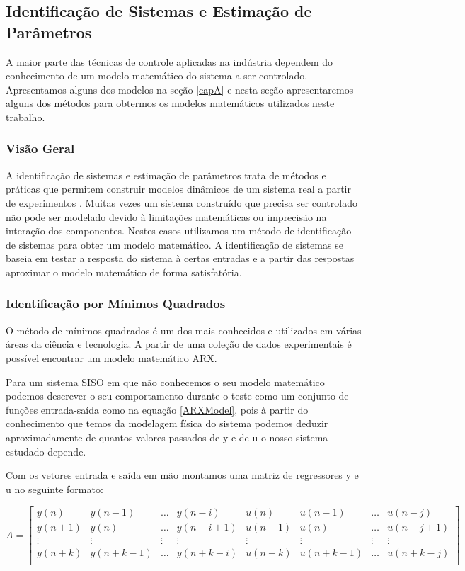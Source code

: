 \subsection{Identificação de Sistemas e Estimação de Parâmetros}
A maior parte das técnicas de controle aplicadas na indústria dependem do conhecimento de um modelo matemático do sistema a ser controlado. Apresentamos alguns dos modelos na seção \ref{capA} e nesta seção apresentaremos alguns dos métodos para obtermos os modelos matemáticos utilizados neste trabalho.


\subsubsection{Visão Geral}
A identificação de sistemas e estimação de parâmetros trata de métodos e práticas que permitem construir modelos dinâmicos de um sistema real a partir de experimentos . Muitas vezes um sistema construído que precisa ser controlado não pode ser modelado devido à limitações matemáticas ou imprecisão na interação dos componentes. Nestes casos utilizamos um método de identificação de sistemas para obter um modelo matemático. A identificação de sistemas se baseia em testar a resposta do sistema à certas entradas e a partir das respostas aproximar o modelo matemático de forma satisfatória.


\subsubsection{Identificação por Mínimos Quadrados}
O método de mínimos quadrados é um dos mais conhecidos e utilizados em várias áreas da ciência e tecnologia. A partir de uma coleção de dados experimentais é possível encontrar um modelo matemático ARX.


Para um sistema SISO em que não conhecemos o seu modelo matemático podemos descrever o seu comportamento durante o teste como um conjunto de funções entrada-saída como na equação \ref{ARXModel}, pois à partir do conhecimento que temos da modelagem física do sistema podemos deduzir aproximadamente de quantos valores passados de y e de u o nosso sistema estudado depende.


Com os vetores entrada e saída em mão montamos uma matriz de regressores y e u no seguinte formato:

\begin{equation}
A=
\begin{bmatrix}
y(n) & y(n-1) & \dots & y(n-i) & u(n) & u(n-1) & \dots & u(n-j)\\
y(n+1) & y(n) & \dots & y(n-i+1) & u(n+1) & u(n) & \dots & u(n-j+1)\\
\vdots & \vdots & \vdots & \vdots & \vdots & \vdots & \vdots  & \vdots\\
y(n+k) & y(n+k-1) & \dots & y(n+k-i) & u(n+k) & u(n+k-1) & \dots & u(n+k-j)\\
\end{bmatrix}
\end{equation}

